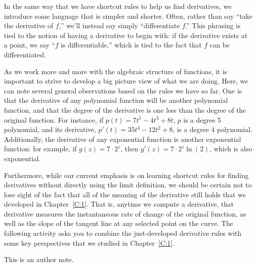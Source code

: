 

In the same way that we have shortcut rules to help us find derivatives, we introduce some language that is simpler and shorter.  Often, rather than say ``take the derivative of $f$,'' we'll instead say simply ``differentiate $f$.''  This phrasing is tied to the notion of having a derivative to begin with:  if the derivative exists at a point, we say ``$f$ is differentiable,'' which is tied to the fact that $f$ can be differentiated.

As we work more and more with the algebraic structure of functions, it is important to strive to develop a big picture view of what we are doing.  Here, we can note several general observations based on the rules we have so far.  One is that the derivative of any polynomial function will be another polynomial function, and that the degree of the derivative is one less than the degree of the original function.  For instance, if $p(t) = 7t^5 - 4t^3 + 8t$, $p$ is a degree 5 polynomial, and its derivative, $p'(t) = 35t^4 - 12t^2 + 8$, is a degree 4 polynomial.  Additionally, the derivative of any exponential function is another exponential function: for example, if $g(z) = 7 \cdot 2^z$, then $g'(z) = 7 \cdot 2^z \ln(2)$, which is also exponential.

Furthermore, while our current emphasis is on learning shortcut rules for finding derivatives without directly using the limit definition, we should be certain not to lose sight of the fact that all of the meaning of the derivative still holds that we developed in Chapter~\ref{C:1}.  That is, anytime we compute a derivative, that derivative measures the instantaneous rate of change of the original function, as well as the slope of the tangent line at any selected point on the curve.  The following activity asks you to combine the just-developed derivative rules with some key perspectives that we studied in Chapter~\ref{C:1}.



\begin{authornote}
This is an author note.
\end{authornote}


